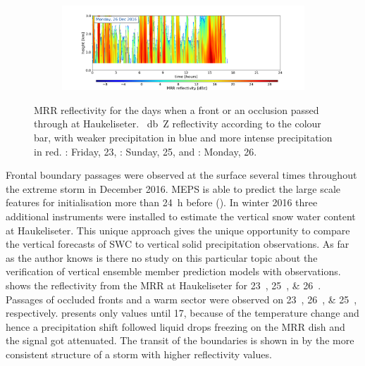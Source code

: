 \begin{figure}[h!]
\begin{subfigure}[t]{\textwidth}
		\caption{}\label{fig:ret:refl26}
	\end{subfigure}
	\begin{subfigure}[t]{\textwidth}
		\includegraphics[trim={6.5cm 0cm 5.3cm 15.5cm},clip,width=\textwidth]{./fig_MRR_refl/MRR_20161226}
	\end{subfigure}
	\caption{MRR reflectivity for the days when a front or an occlusion passed through at Haukeliseter. \SI{}{\decibel Z} reflectivity according to the colour bar, with weaker precipitation in blue and more intense precipitation in red. \protect{}: Friday, \SI{23}{\dec}, \protect{}: Sunday, \SI{25}{\dec}, and \protect{}: Monday, \SI{26}{\dec}.}\label{fig:ret:refl}
\end{figure}
\noindent
Frontal boundary passages were observed at the surface several times throughout the extreme storm in December 2016. MEPS is able to predict the large scale features for initialisation more than \SI{24}{\hour} before (). In winter 2016 three additional instruments were installed to estimate the vertical snow water content at Haukeliseter. This unique approach gives the unique opportunity to compare the vertical forecasts of SWC to vertical solid precipitation observations. As far as the author knows is there no study on this particular topic about the verification of vertical ensemble member prediction models with observations.
\\
 shows the reflectivity from the MRR at Haukeliseter for \SIlist{23;25;26}{\dec}. Passages of occluded fronts and a warm sector were observed on \SIlist{23;26;25}{\dec}, respectively.  presents only values until \SI{17}{\UTC}, because of the temperature change and hence a precipitation shift followed liquid drops freezing on the MRR dish and the signal got attenuated. 
The transit of the boundaries is shown in  by the more consistent structure of a storm with higher reflectivity values. 
